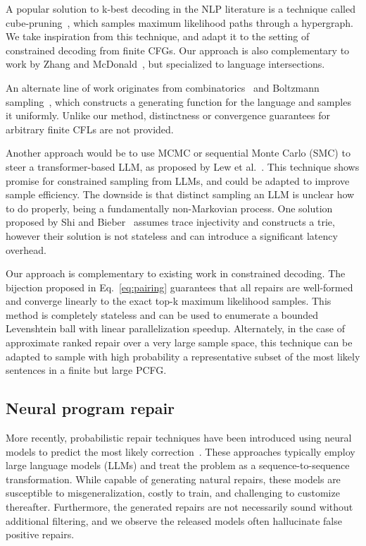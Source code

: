 \documentclass[sigplan,acmsmall,nonacm,screen]{acmart}\settopmatter{printfolios=false,printccs=false,printacmref=false}
\begin{document}
A popular solution to k-best decoding in the NLP literature is a technique called cube-pruning~\cite{huang2005better, huang2007forest, chiang2007hierarchical}, which samples maximum likelihood paths through a hypergraph. We take inspiration from this technique, and adapt it to the setting of constrained decoding from finite CFGs. Our approach is also complementary to work by Zhang and McDonald~\cite{zhang2012generalized}, but specialized to language intersections.

  An alternate line of work originates from combinatorics~\cite{hickey1983uniform, gore1997quasi} and Boltzmann sampling~\cite{duchon2004boltzmann}, which constructs a generating function for the language and samples it uniformly. Unlike our method, distinctness or convergence guarantees for arbitrary finite CFLs are not provided.

  Another approach would be to use MCMC or sequential Monte Carlo (SMC) to steer a transformer-based LLM, as proposed by Lew et al.~\cite{lew2023sequential}. This technique shows promise for constrained sampling from LLMs, and could be adapted to improve sample efficiency. The downside is that distinct sampling an LLM is unclear how to do properly, being a fundamentally non-Markovian process. One solution proposed by Shi and Bieber~\cite{shi2020incremental} assumes trace injectivity and constructs a trie, however their solution is not stateless and can introduce a significant latency overhead.

  Our approach is complementary to existing work in constrained decoding. The bijection proposed in Eq.~\ref{eq:pairing} guarantees that all repairs are well-formed and converge linearly to the exact top-k maximum likelihood samples. This method is completely stateless and can be used to enumerate a bounded Levenshtein ball with linear parallelization speedup. Alternately, in the case of approximate ranked repair over a very large sample space, this technique can be adapted to sample with high probability a representative subset of the most likely sentences in a finite but large PCFG.

  \subsection{Neural program repair}

  More recently, probabilistic repair techniques have been introduced using neural models to predict the most likely correction~\cite{allamanis2021self, chirkova2021empirical, drain2021generating}. These approaches typically employ large language models (LLMs) and treat the problem as a sequence-to-sequence transformation. While capable of generating natural repairs, these models are susceptible to misgeneralization, costly to train, and challenging to customize thereafter. Furthermore, the generated repairs are not necessarily sound without additional filtering, and we observe the released models often hallucinate false positive repairs.
\end{document}
